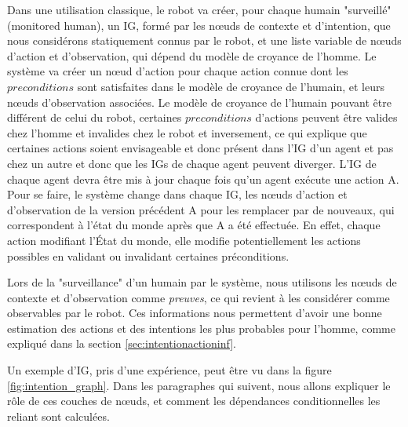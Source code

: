 \documentclass[a4paper,11pt,twoside]{StyleThese}
\begin{document}
Dans une utilisation classique, le robot va créer, pour chaque humain "surveillé" (monitored human), un IG, formé par les nœuds de contexte et d'intention, que nous considérons statiquement connus par le robot, et une liste variable de nœuds d'action et d'observation, qui dépend du modèle de croyance de l'homme. Le système va créer un nœud d'action pour chaque action connue dont les  $preconditions$ sont satisfaites dans le modèle de croyance de l'humain, et leurs nœuds d'observation associées. Le modèle de croyance de l'humain pouvant être différent de celui du robot, certaines $preconditions$ d'actions peuvent être valides chez l'homme et invalides chez le robot et inversement, ce qui explique que certaines actions soient envisageable et donc présent dans l'IG d'un agent et pas chez un autre et donc que les IGs de chaque agent peuvent diverger. L'IG de chaque agent devra être mis à jour chaque fois qu'un agent exécute une action A. Pour se faire, le système change dans chaque IG, les nœuds d'action et d'observation de la version précédent A pour les remplacer par de nouveaux, qui correspondent à l'état du monde après que A a été effectuée. En effet, chaque action modifiant l'État du monde, elle modifie potentiellement les actions possibles en validant ou invalidant certaines préconditions.


Lors de la "surveillance" d'un humain par le système, nous utilisons les nœuds de contexte et d'observation comme \textit{preuves}, ce qui revient à les considérer comme observables par le robot. Ces informations nous permettent d'avoir une bonne estimation des actions et des intentions les plus probables pour l'homme, comme expliqué dans la section \ref{sec:intentionactioninf}.

Un exemple d'IG, pris d'une expérience, peut être vu dans la figure \ref{fig:intention_graph}. Dans les paragraphes qui suivent, nous allons expliquer le rôle de ces couches de nœuds, et comment les dépendances conditionnelles les reliant sont calculées.
\end{document}
